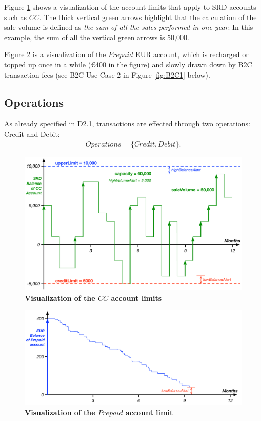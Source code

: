 Figure \ref{fig:accountLimitsCC} shows a visualization of the account limits that apply to SRD accounts such as $CC$. The thick vertical green arrows highlight that the calculation of the sale volume is defined as \emph{the sum of all the sales performed in one year}. In this example, the sum of all the vertical green arrows is 50,000.

Figure \ref{fig:accountLimitsPrepaid} is a visualization of the $Prepaid$ EUR account, which is recharged or topped up once in a while (\euro 400 in the figure) and slowly drawn down by B2C transaction fees (see B2C Use Case 2 in Figure \ref{fig:B2C1} below).

\subsection{Operations}
As already specified in D2.1, transactions are effected through two operations: Credit and Debit:
\begin{align}
Operations = \{ Credit, Debit \}.
\end{align}

\begin{figure}[H]
\centering
\includegraphics[width=16cm]{Figures/Account_Limits_CC}
\caption{\small\textbf{Visualization of the $CC$ account limits}}
\label{fig:accountLimitsCC}
\end{figure}
\vspace{-0.5cm}

\begin{figure}[htbp]
\centering
\includegraphics[width=16cm]{Figures/Account_Limits_Prepaid}
\caption{\small\textbf{Visualization of the $Prepaid$ account limit}}
\label{fig:accountLimitsPrepaid}
\end{figure}
\vspace{-0.5cm}


